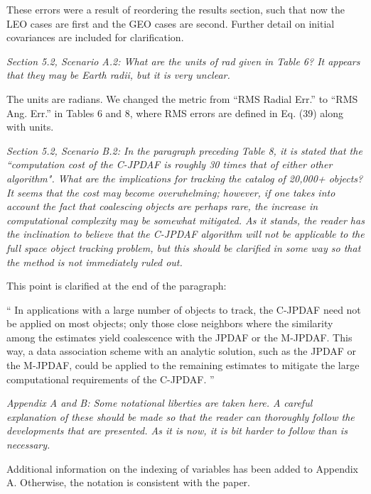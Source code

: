 \documentclass[11pt]{article}
\newenvironment{correction}{\begin{list}{}{\setlength{\leftmargin}{1cm}\setlength{\rightmargin}{1cm}}\vspace{\parsep}\item[]``}{''\end{list}}
\begin{document}
\begin{itemize}
These errors were a result of reordering the results section, such that now the LEO cases are first and the GEO cases are second. Further detail on initial covariances are included for clarification.

\item {\itshape Section 5.2, Scenario A.2:
What are the units of rad given in Table 6?  It appears that they may be Earth radii, but it is very unclear.}

The units are radians. We changed the metric from ``RMS Radial Err.'' to ``RMS Ang. Err.'' in Tables 6 and 8, where RMS errors are defined in Eq. (39) along with units.

\item {\itshape Section 5.2, Scenario B.2:
In the paragraph preceding Table 8, it is stated that the ``computation cost of the C-JPDAF is roughly 30 times that of either other algorithm".  What are the implications for tracking the catalog of 20,000+ objects?  It seems that the cost may become overwhelming; however, if one takes into account the fact that coalescing objects are perhaps rare, the increase in computational complexity may be somewhat mitigated.  As it stands, the reader has the inclination to believe that the C-JPDAF algorithm will not be applicable to the full space object tracking problem, but this should be clarified in some way so that the method is not immediately ruled out.}

This point is clarified at the end of the paragraph:

\begin{correction}
In applications with a large number of objects to track, the C-JPDAF need not be applied on most objects; only those close neighbors where the similarity among the estimates yield coalescence with the JPDAF or the M-JPDAF. This way, a data association scheme with an analytic solution, such as the JPDAF or the M-JPDAF, could be applied to the remaining estimates to mitigate the large computational requirements of the C-JPDAF.
\end{correction}

\item {\itshape Appendix A and B:
Some notational liberties are taken here.  A careful explanation of these should be made so that the reader can thoroughly follow the developments that are presented.  As it is now, it is bit harder to follow than is necessary.}

Additional information on the indexing of variables has been added to Appendix A.
Otherwise, the notation is consistent with the paper.







\end{itemize}
\end{document}
